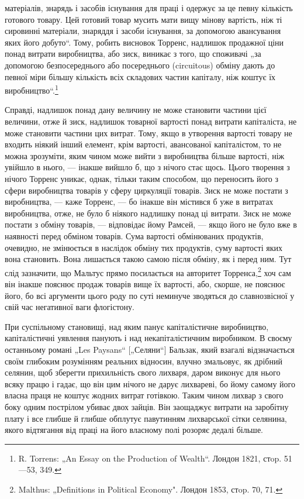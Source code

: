 \parcont{}  %
матеріалів, знарядь і засобів існування для праці і одержує за
це певну кількість готового товару. Цей готовий товар мусить
мати вищу мінову вартість, ніж ті сировинні матеріали, знаряддя
і засоби існування, за допомогою авансування яких його
добуто“. Тому, робить висновок Торренс, надлишок продажної ціни
понад витрати виробництва, або зиск, виникає з того, що споживачі
„за допомогою безпосереднього або посереднього (circuitous)
обміну дають до певної міри більшу кількість всіх складових
частин капіталу, ніж коштує їх виробництво“.\footnote{
R. Torrens: „An Essay on the Production of Wealth“. Лондон 1821, стop.
51—53, 349.
}

Справді, надлишок понад дану величину не може становити
частини цієї величини, отже й зиск, надлишок товарної вартості
понад витрати капіталіста, не може становити частини цих витрат.
Тому, якщо в утворення вартості товару не входить
ніякий інший елемент, крім вартості, авансованої капіталістом,
то не можна зрозуміти, яким чином може вийти з виробництва
більше вартості, ніж увійшло в нього, — інакше вийшло б, що
з нічого стає щось. Цього творення з нічого Торренс уникає,
однак, тільки таким способом, що переносить його з сфери виробництва
товарів у сферу циркуляції товарів. Зиск не може постати
з виробництва, — каже Торренс, — бо інакше він містився б уже
в витратах виробництва, отже, не було б ніякого надлишку понад
ці витрати. Зиск не може постати з обміну товарів, — відповідає
йому Рамсей, — якщо його не було вже в наявності перед обміном
товарів. Сума вартості обмінюваних продуктів, очевидно,
не змінюється в наслідок обміну тих продуктів, суму вартості
яких вона становить. Вона лишається такою самою після обміну,
як і перед ним. Тут слід зазначити, що Мальтус прямо посилається
на авторитет Торренса,\footnote{
Malthus: „Definitions in Political Economy". Лондон 1853, стop. 70, 71.
} хоч сам він інакше пояснює
продаж товарів вище їх вартості, або, скорше, не пояснює його,
бо всі аргументи цього роду по суті неминуче зводяться до
славнозвісної у свій час негативної ваги флогістону.

При суспільному становищі, над яким панує капіталістичне виробництво,
капіталістичні уявлення панують і над некапіталістичним
виробником. В своєму останньому романі „Les Paysans“
[„Селяни“] Бальзак, який взагалі відзначається своїм глибоким
розумінням реальних відносин, влучно змальовує, як дрібний
селянин, щоб зберегти прихильність свого лихваря, даром виконує
для нього всяку працю і гадає, що він цим нічого не
дарує лихвареві, бо йому самому його власна праця не коштує
жодних витрат готівкою. Таким чином лихвар з свого боку
одним пострілом убиває двох зайців. Він заощаджує витрати
на заробітну плату і все глибше й глибше обплутує павутинням
лихварської сітки селянина, якого відтягання від праці на його
власному полі розоряє дедалі більше.
